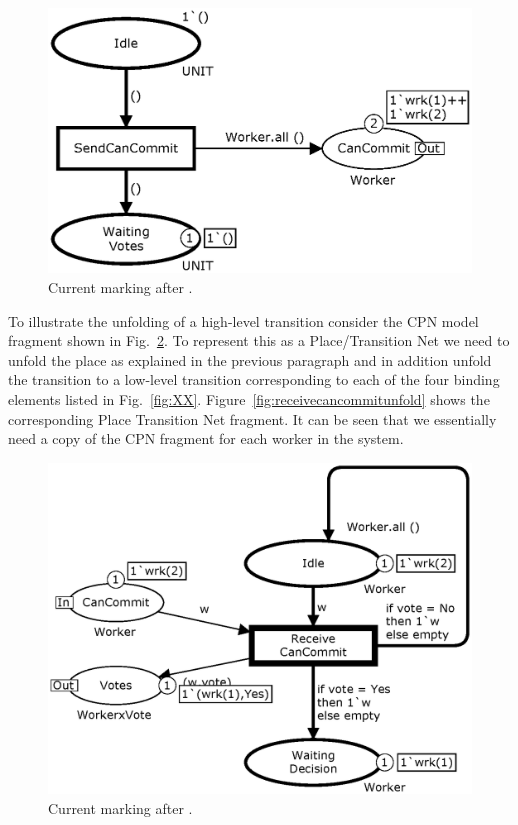 \begin{figure}[h]
\centering
\includegraphics[scale=.5]{figures/SendCanCommit.eps}
\caption{Current marking after .}
\label{fig:sendcancommit}
\end{figure}


To illustrate the unfolding of a high-level transition consider the
CPN model fragment shown in Fig.~\ref{fig:receivecancommit}. To
represent this as a Place/Transition Net we need to unfold the place
as explained in the previous paragraph and in addition unfold the
transition  to a low-level transition
corresponding to each of the four binding elements listed in
Fig.~\ref{fig:XX}. Figure~\ref{fig:receivecancommitunfold} shows the
corresponding Place Transition Net fragment. It can be seen that we
essentially need a copy of the CPN fragment for each worker in the
system.

\begin{figure}[h]
\centering
\includegraphics[scale=.5]{figures/ReceiveCanCommit.eps}
\caption{Current marking after .}
\label{fig:receivecancommit}
\end{figure}

